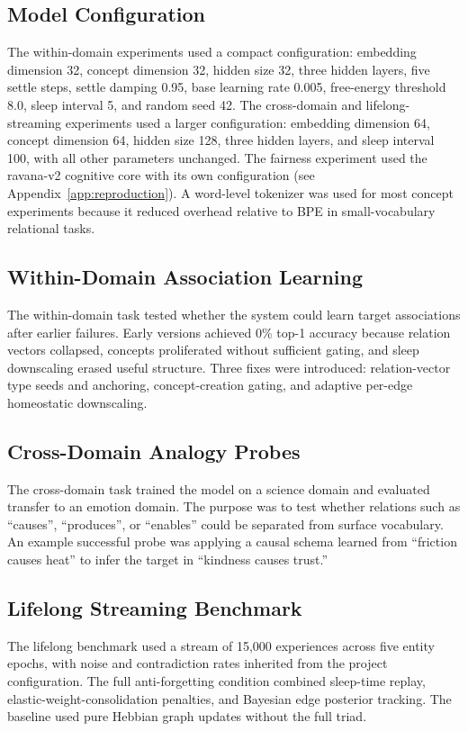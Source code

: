 \documentclass[11pt]{article}
\begin{document}
\subsection{Model Configuration}
The within-domain experiments used a compact configuration: embedding dimension 32, concept dimension 32, hidden size 32, three hidden layers, five settle steps, settle damping 0.95, base learning rate 0.005, free-energy threshold 8.0, sleep interval 5, and random seed 42. The cross-domain and lifelong-streaming experiments used a larger configuration: embedding dimension 64, concept dimension 64, hidden size 128, three hidden layers, and sleep interval 100, with all other parameters unchanged. The fairness experiment used the ravana-v2 cognitive core with its own configuration (see Appendix~\ref{app:reproduction}). A word-level tokenizer was used for most concept experiments because it reduced overhead relative to BPE in small-vocabulary relational tasks.

\subsection{Within-Domain Association Learning}
The within-domain task tested whether the system could learn target associations after earlier failures. Early versions achieved 0\% top-1 accuracy because relation vectors collapsed, concepts proliferated without sufficient gating, and sleep downscaling erased useful structure. Three fixes were introduced: relation-vector type seeds and anchoring, concept-creation gating, and adaptive per-edge homeostatic downscaling.

\subsection{Cross-Domain Analogy Probes}
The cross-domain task trained the model on a science domain and evaluated transfer to an emotion domain. The purpose was to test whether relations such as ``causes'', ``produces'', or ``enables'' could be separated from surface vocabulary. An example successful probe was applying a causal schema learned from ``friction causes heat'' to infer the target in ``kindness causes trust.''

\subsection{Lifelong Streaming Benchmark}
The lifelong benchmark used a stream of 15,000 experiences across five entity epochs, with noise and contradiction rates inherited from the project configuration. The full anti-forgetting condition combined sleep-time replay, elastic-weight-consolidation penalties, and Bayesian edge posterior tracking. The baseline used pure Hebbian graph updates without the full triad.
\end{document}
